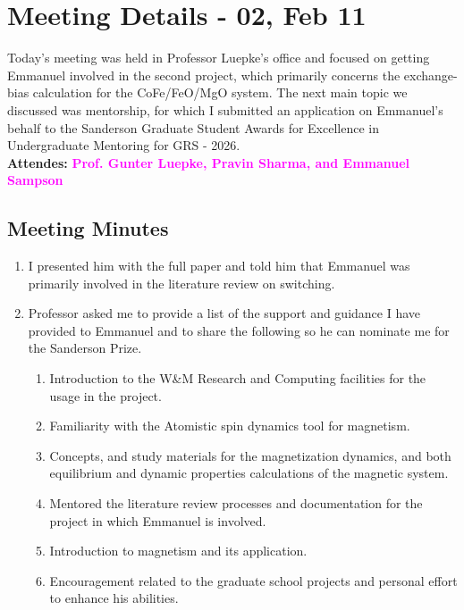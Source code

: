 \section{Meeting Details - 02, Feb 11}
\label{chap:Meeting_02}
Today's meeting was held in Professor Luepke's office and focused on getting Emmanuel involved in the second project, which primarily concerns the exchange-bias calculation for the CoFe/FeO/MgO system. The next main topic we discussed was mentorship, for which I submitted an application on Emmanuel's behalf to the Sanderson Graduate Student Awards for Excellence in Undergraduate Mentoring for GRS - 2026.  \\ \textbf{Attendes:}
\textcolor{magenta}{\textbf{Prof. Gunter Luepke, Pravin Sharma, and Emmanuel Sampson}}
\subsection*{Meeting Minutes}
\begin{enumerate}  %
    \item I presented him with the full paper and told him that Emmanuel was primarily involved in the literature review on switching.
    \item Professor asked me to provide a list of the support and guidance I have provided to Emmanuel and to share the following so he can nominate me for the Sanderson Prize. 
    \begin{enumerate} [\ding{226}]
        \item Introduction to the W\&M Research and Computing facilities for the usage in the project.
        \item Familiarity with the Atomistic spin dynamics tool for magnetism.
        \item Concepts, and study materials for the magnetization dynamics, and both equilibrium and dynamic properties calculations of the magnetic system.
        \item Mentored the literature review processes and documentation for the project in which Emmanuel is involved.
        \item Introduction to magnetism and its application.
        \item Encouragement related to the graduate school projects and personal effort to enhance his abilities.
    \end{enumerate}    
\end{enumerate}
